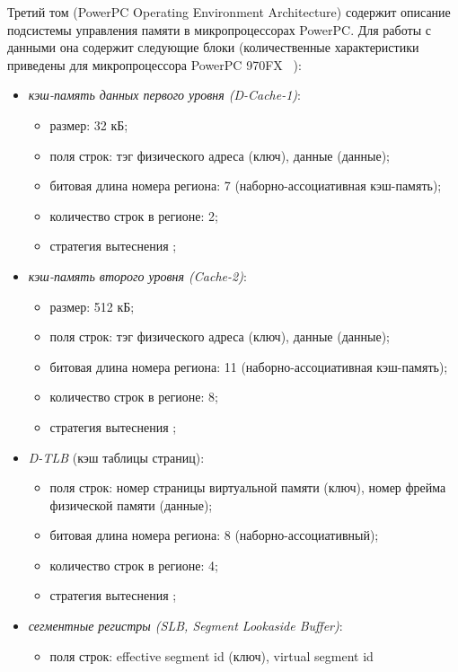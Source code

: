 Третий том (PowerPC Operating Environment Architecture) содержит описание подсистемы управления памяти в микропроцессорах PowerPC. Для работы с данными она содержит следующие блоки (количественные характеристики приведены для микропроцессора PowerPC 970FX
~\cite{PowerPC970FXUserManual}):
\begin{itemize}
  \item \emph{кэш-память данных первого уровня (D-Cache-1)}:
        \begin{itemize}
            \item размер: 32 кБ;
            \item поля строк: тэг физического адреса (ключ), данные (данные);
            \item битовая длина номера региона: 7 (наборно-ассоциативная
кэш-память);
            \item количество строк в регионе: 2;
            \item стратегия вытеснения \LRU;
        \end{itemize}
  \item \emph{кэш-память второго уровня (Cache-2)}:
        \begin{itemize}
            \item размер: 512 кБ;
            \item поля строк: тэг физического адреса (ключ), данные (данные);
            \item битовая длина номера региона: 11 (наборно-ассоциативная
кэш-память);
            \item количество строк в регионе: 8;
            \item стратегия вытеснения \LRU;
        \end{itemize}
  \item \emph{D-TLB} (кэш таблицы страниц):
        \begin{itemize}
            \item поля строк: номер страницы виртуальной памяти (ключ), номер
фрейма физической памяти (данные);
            \item битовая длина номера региона: 8 (наборно-ассоциативный);
            \item количество строк в регионе: 4;
            \item стратегия вытеснения \LRU;
        \end{itemize}
  \item \emph{сегментные регистры (SLB, Segment Lookaside Buffer)}:
        \begin{itemize}
            \item поля строк: effective segment id (ключ), virtual segment id

\end{itemize}
\end{itemize}
